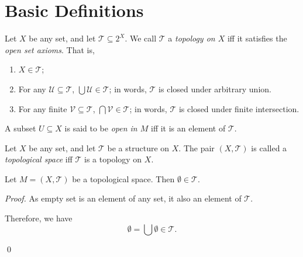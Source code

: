 \section{Basic Definitions}


\begin{definition}
	\label{definition: open set axioms}
	Let $X$ be any set, and let $\mathcal T \subseteq 2^X$. We call $\mathcal T$ a \textit{topology on $X$} iff it satisfies the \textit{open set axioms}. That is,
	\begin{enumerate}[\bfseries O1.]
		\item $X \in \mathcal T$;
		\item For any $\mathcal U \subseteq \mathcal T$, $\bigcup \mathcal U \in \mathcal T$; in words, $\mathcal T$ is closed under arbitrary union.
		\item For any finite $\mathcal V \subseteq \mathcal T$, $\bigcap \mathcal V \in \mathcal T$; in words, $\mathcal T$ is closed under finite intersection.
	\end{enumerate}
	
	A subset $U \subseteq X$ is said to be \textit{open in $M$} iff it is an element of $\mathcal T$.
\end{definition}


\begin{definition}
	\label{definition: topological space}
	Let $X$ be any set, and let $\mathcal T$ be a structure on $X$. The pair $(X, \mathcal T)$ is called a \textit{topological space} iff $\mathcal T$ is a topology on $X$.
\end{definition}


\begin{theorem}
	\label{theorem: empty set is an element of topology}
	Let $M = (X, \mathcal T)$ be a topological space. Then $\emptyset \in \mathcal T$.
	
	\begin{proof}
		As empty set is an element of any set, it also an element of $\mathcal T$.
		
		Therefore, we have
		$$
		\emptyset = \bigcup \emptyset \in \mathcal T.
		$$
		
		\qed
	\end{proof}
\end{theorem}


